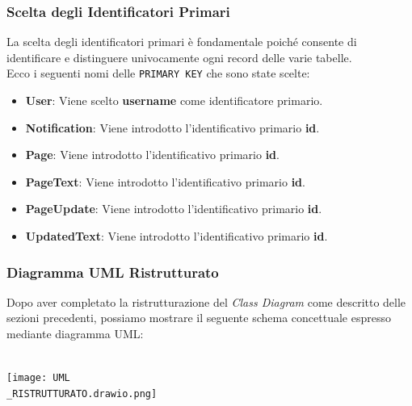 \documentclass{article}
\begin{document}
	\subsubsection{Scelta degli Identificatori Primari}
	La scelta degli identificatori primari è fondamentale poiché consente di identificare e distinguere univocamente ogni record delle varie tabelle.
	\\
	Ecco i seguenti nomi delle \texttt{PRIMARY KEY} che sono state scelte:
	\\
	\begin{itemize}
		\item \textbf{User}: Viene scelto \textbf{username} come identificatore primario.
		\item \textbf{Notification}: Viene introdotto l'identificativo primario \textbf{id}.
		\item \textbf{Page}: Viene introdotto l'identificativo primario \textbf{id}.
		\item \textbf{PageText}: Viene introdotto l'identificativo primario \textbf{id}.
		\item \textbf{PageUpdate}: Viene introdotto l'identificativo primario \textbf{id}.
		\item \textbf{UpdatedText}: Viene introdotto l'identificativo primario \textbf{id}.
	\end{itemize}


	\newpage


	\subsubsection{Diagramma UML Ristrutturato}
	Dopo aver completato la ristrutturazione del \textit{Class Diagram} come descritto delle sezioni precedenti, possiamo mostrare il seguente schema concettuale espresso mediante diagramma UML:
	\\\\
	
	\begin{center}
		\texttt{[image: UML\\\_RISTRUTTURATO.drawio.png]}
	\end{center}
	
	
	\newpage
	
\end{document}
